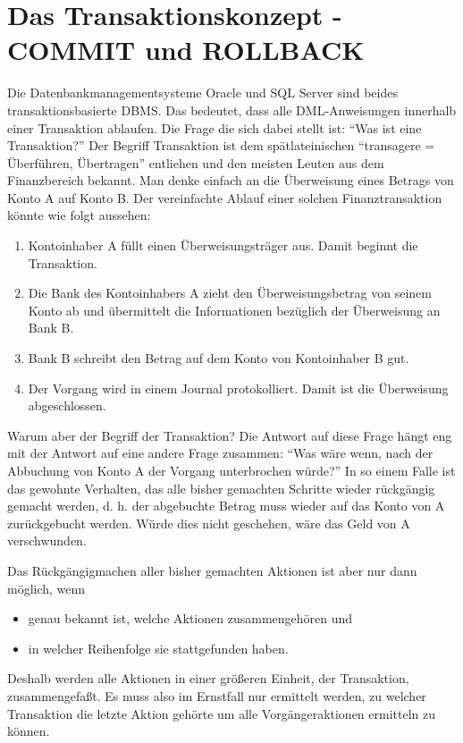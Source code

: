 \section{Das Transaktionskonzept - COMMIT und ROLLBACK}
Die Datenbankmanagementsysteme Oracle und SQL Server sind beides
transaktionsbasierte DBMS. Das bedeutet, dass alle DML-Anweisungen
innerhalb einer Transaktion ablaufen. Die Frage die sich dabei stellt ist:
\enquote{Was ist eine Transaktion?} Der Begriff Transaktion ist dem
spätlateinischen \enquote{transagere = Überführen, Übertragen}
entliehen und den meisten Leuten aus dem Finanzbereich bekannt. Man denke
einfach an die Überweisung eines Betrags von Konto A auf Konto B. Der
vereinfachte Ablauf einer solchen Finanztransaktion könnte wie folgt
aussehen:
\begin{enumerate}
    \item Kontoinhaber A füllt einen Überweisungsträger aus. Damit
          beginnt die Transaktion.
    \item Die Bank des Kontoinhabers A zieht den Überweisungsbetrag von
          seinem Konto ab und übermittelt die Informationen bezüglich der
          Überweisung an Bank B.
    \item Bank B schreibt den Betrag auf dem Konto von Kontoinhaber B gut.
    \item Der Vorgang wird in einem Journal protokolliert. Damit ist die
          Überweisung abgeschlossen.
\end{enumerate}
Warum aber der Begriff der Transaktion? Die Antwort auf diese Frage
hängt eng mit der Antwort auf eine andere Frage zusammen: \enquote{Was
    wäre wenn, nach der Abbuchung von Konto A der Vorgang unterbrochen
    würde?} In so einem Falle ist das gewohnte Verhalten, das alle bisher
gemachten Schritte wieder rückgängig gemacht werden, d. h. der
abgebuchte Betrag muss wieder auf das Konto von A zurückgebucht werden.
Würde dies nicht geschehen, wäre das Geld von A verschwunden.

Das Rückgängigmachen aller bisher gemachten Aktionen ist aber nur dann
möglich, wenn
\begin{itemize}
    \item genau bekannt ist, welche Aktionen zusammengehören und
    \item  in welcher Reihenfolge sie stattgefunden haben.
\end{itemize}
Deshalb werden alle Aktionen in einer größeren Einheit, der
Transaktion, zusammengefaßt. Es muss also im Ernstfall nur ermittelt
werden, zu welcher Transaktion die letzte Aktion gehörte um alle
Vorgängeraktionen ermitteln zu können.

